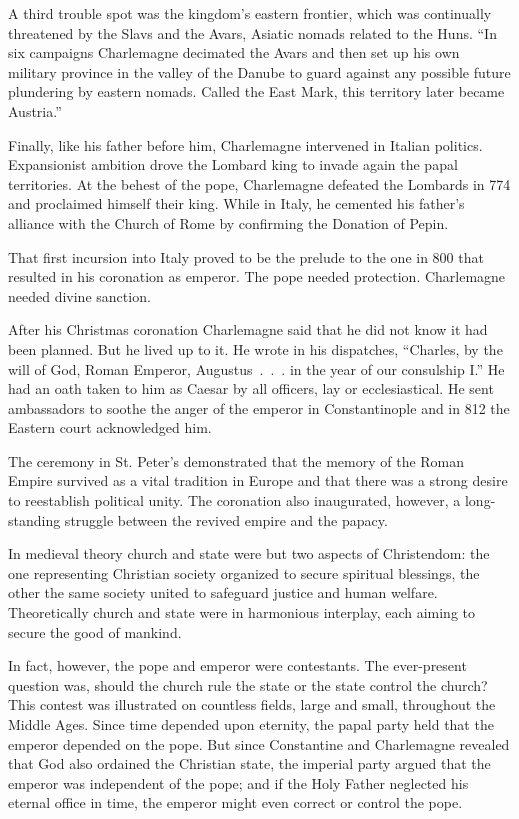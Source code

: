 A third trouble spot was the kingdom’s eastern frontier, which was continually threatened by the
Slavs and the Avars, Asiatic nomads related to the Huns. “In six campaigns Charlemagne decimated the
Avars and then set up his own military province in the valley of the Danube to guard against any
possible future plundering by eastern nomads. Called the East Mark, this territory later became
Austria.”

Finally, like his father before him, Charlemagne intervened in Italian politics. Expansionist
ambition drove the Lombard king to invade again the papal territories. At the behest of the pope,
Charlemagne defeated the Lombards in 774 and proclaimed himself their king. While in Italy, he
cemented his father’s alliance with the Church of Rome by confirming the Donation of Pepin.

That first incursion into Italy proved to be the prelude to the one in 800 that resulted in his
coronation as emperor. The pope needed protection. Charlemagne needed divine sanction.

After his Christmas coronation Charlemagne said that he did not know it had been planned. But he
lived up to it. He wrote in his dispatches, “Charles, by the will of God, Roman Emperor,
Augustus~.~.~. in the year of our consulship I.” He had an oath taken to him as Caesar by all
officers, lay or ecclesiastical. He sent ambassadors to soothe the anger of the emperor in
Constantinople and in 812 the Eastern court acknowledged him.

The ceremony in St. Peter’s demonstrated that the memory of the Roman Empire survived as a vital
tradition in Europe and that there was a strong desire to reestablish political unity. The
coronation also inaugurated, however, a long-standing struggle between the revived empire and the
papacy.

In medieval theory church and state were but two aspects of Christendom: the one representing
Christian society organized to secure spiritual blessings, the other the same society united to
safeguard justice and human welfare. Theoretically church and state were in harmonious interplay,
each aiming to secure the good of mankind.

In fact, however, the pope and emperor were contestants. The ever-present question was, should the
church rule the state or the state control the church? This contest was illustrated on countless
fields, large and small, throughout the Middle Ages. Since time depended upon eternity, the papal
party held that the emperor depended on the pope. But since Constantine and Charlemagne revealed
that God also ordained the Christian state, the imperial party argued that the emperor was
independent of the pope; and if the Holy Father neglected his eternal office in time, the emperor
might even correct or control the pope.

